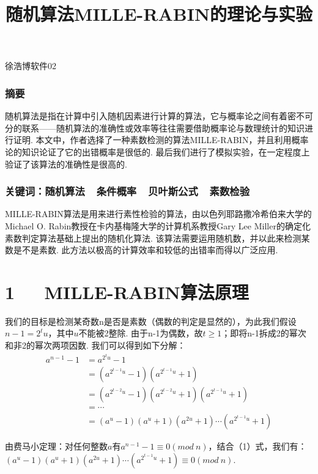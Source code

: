 \documentclass[UTF8]{ctexart}
\begin{document}
\renewcommand{\thefootnote}{\fnsymbol{footnote}}
\linespread{1.4}
\title{\vspace{-5em}\heiti 随机算法MILLE-RABIN的理论与实验\vspace{-2.5em}}
\date{}
\maketitle
\begin{center}
{\fangsong 徐浩博\quad 软件02}
\end{center}

\subsubsection*{摘要}
{\kaishu\normalsize  随机算法是指在计算中引入随机因素进行计算的算法，它与概率论之间有着密不可分的联系——随机算法的准确性或效率等往往需要借助概率论与数理统计的知识进行证明. 本文中，作者选择了一种素数检测的算法MILLE-RABIN，并且利用概率论的知识论证了它的出错概率是很低的. 最后我们进行了模拟实验，在一定程度上验证了该算法的准确性是很高的.}
\subsubsection*{关键词：随机算法\ \  条件概率\ \ 贝叶斯公式\ \ 素数检验\ \ \vspace{1.5em}}
\vspace{2em}
MILLE-RABIN算法是用来进行素性检验的算法，由以色列耶路撒冷希伯来大学的Michael O. Rabin教授在卡内基梅隆大学的计算机系教授Gary Lee Miller的确定化素数判定算法基础上提出的随机化算法. 该算法需要运用随机数，并以此来检测某数是不是素数. 此方法以极高的计算效率和较低的出错率而得以广泛应用.
\section*{1\ \ \ MILLE-RABIN算法原理}
我们的目标是检测某奇数n是否是素数（偶数的判定是显然的），为此我们假设$n-1=2^tu$，其中$u$不能被2整除. 由于n-1为偶数，故$t\geq 1$；即将n-1拆成2的幂次和非2的幂次两项因数. 我们可以得到如下分解：
\begin{equation}
\begin{split}
    a^{n-1}-1&=a^{2^tu}-1\\
    &=(a^{2^{t-1}u}-1)(a^{2^{t-1}u}+1)\\
    &=(a^{2^{t-2}u}-1)(a^{2^{t-2}u}+1)(a^{2^{t-1}u}+1)\\
    &=\cdots\\
    &=(a^u-1)(a^u+1)(a^{2u}+1)\cdots(a^{2^{t-1}u}+1)
\end{split}
\end{equation}\par
由费马小定理：对任何整数$a$有$a^{n-1}-1\equiv 0(mod\ n)$，结合（1）式，我们有：
$(a^u-1)(a^u+1)(a^{2u}+1)\cdots(a^{2^{t-1}u}+1)\equiv 0(mod\ n)$.
\end{document}

